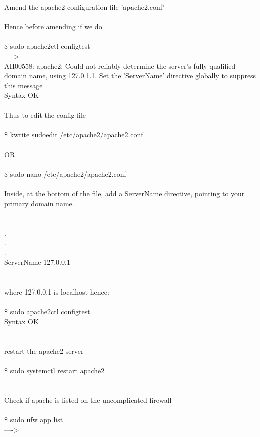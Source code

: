 \documentclass[10pt,a4paper]{article}
\begin{document}
{{{{{{{{{{{{{{{{Amend the apache2 configuration file 'apache2.conf'\\
\\
Hence before amending if we do\\
\\
\$ sudo apache2ctl configtest \\
---->\\
AH00558: apache2: Could not reliably determine the server's fully qualified domain name, using 127.0.1.1. Set the 'ServerName' directive globally to suppress this message}{\large \\
Syntax OK\\
\\
Thus to edit the config file\\
\\
\$ kwrite sudoedit /etc/apache2/apache2.conf}{\large \\
\\
OR\\
\\
\$ sudo nano /etc/apache2/apache2.conf}{\large \\
\\
Inside, at the bottom of the file, add a ServerName directive, pointing to your primary domain name. \\
\\
--------------------------------------------------------\\
.\\
.\\
.\\
ServerName 127.0.0.1\\
--------------------------------------------------------\\
\\
where 127.0.0.1 is localhost  hence:\\
\\
\$ sudo apache2ctl configtest\\
Syntax OK\\
\\
\\
restart the apache2 server\\
\\
\$ sudo systemctl restart apache2\\
\\
\\
Check if apache is listed on the uncomplicated firewall\\
\\
\$ sudo ufw app list\\
---->\\
}}}}}}}}}}}}}}}}
\end{document}
